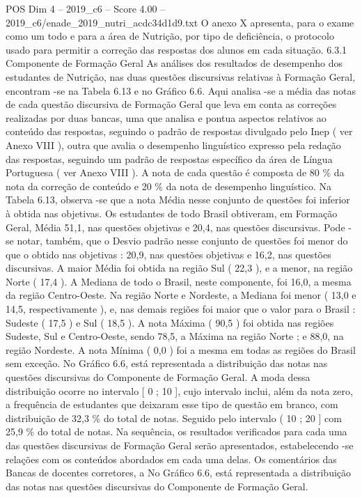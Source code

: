 \begin{textsample}{POS Dim 4 – 2019\_c6 – Score 4.00 – 2019\_c6/enade\_2019\_nutri\_acdc34d1d9.txt}
O anexo X apresenta, para o exame como um todo e para a área de Nutrição, por tipo de deficiência, o protocolo usado para permitir a correção das respostas dos alunos em cada situação. 6.3.1 Componente de Formação Geral As análises dos resultados de desempenho dos estudantes de Nutrição, nas duas questões discursivas relativas à Formação Geral, encontram -se na Tabela 6.13 e no Gráfico 6.6.
Aqui analisa -se a média das notas de cada questão discursiva de Formação Geral que leva em conta as correções realizadas por duas bancas, uma que analisa e pontua aspectos relativos ao conteúdo das respostas, seguindo o padrão de respostas divulgado pelo Inep ( ver Anexo VIII ), outra que avalia o desempenho linguístico expresso pela redação das respostas, seguindo um padrão de respostas específico da área de Língua Portuguesa ( ver Anexo VIII ).
A nota de cada questão é composta de 80 \% da nota da correção de conteúdo e 20 \% da nota de desempenho linguístico.
Na Tabela 6.13, observa -se que a nota Média nesse conjunto de questões foi inferior à obtida nas objetivas.
Os estudantes de todo Brasil obtiveram, em Formação Geral, Média 51,1, nas questões objetivas e 20,4, nas questões discursivas.
Pode -se notar, também, que o Desvio padrão nesse conjunto de questões foi menor do que o obtido nas objetivas : 20,9, nas questões objetivas e 16,2, nas questões discursivas.
A maior Média foi obtida na região Sul ( 22,3 ), e a menor, na região Norte ( 17,4 ).
A Mediana de todo o Brasil, neste componente, foi 16,0, a mesma da região Centro-Oeste.
Na região Norte e Nordeste, a Mediana foi menor ( 13,0 e 14,5, respectivamente ), e, nas demais regiões foi maior que o valor para o Brasil : Sudeste ( 17,5 ) e Sul ( 18,5 ).
A nota Máxima ( 90,5 ) foi obtida nas regiões Sudeste, Sul e Centro-Oeste, sendo 78,5, a Máxima na região Norte ; e 88,0, na região Nordeste.
A nota Mínima ( 0,0 ) foi a mesma em todas as regiões do Brasil sem exceção.
No Gráfico 6.6, está representada a distribuição das notas nas questões discursivas do Componente de Formação Geral.
A moda dessa distribuição ocorre no intervalo [ 0 ; 10 ], cujo intervalo inclui, além da nota zero, a frequência de estudantes que deixaram esse tipo de questão em branco, com distribuição de 32,3 \% do total de notas.
Seguido pelo intervalo ( 10 ; 20 ] com 25,9 \% do total de notas.
Na sequência, os resultados verificados para cada uma das questões discursivas de Formação Geral serão apresentados, estabelecendo -se relações com os conteúdos abordados em cada uma delas.
Os comentários das Bancas de docentes corretores, a No Gráfico 6.6, está representada a distribuição das notas nas questões discursivas do Componente de Formação Geral.

\end{textsample}

